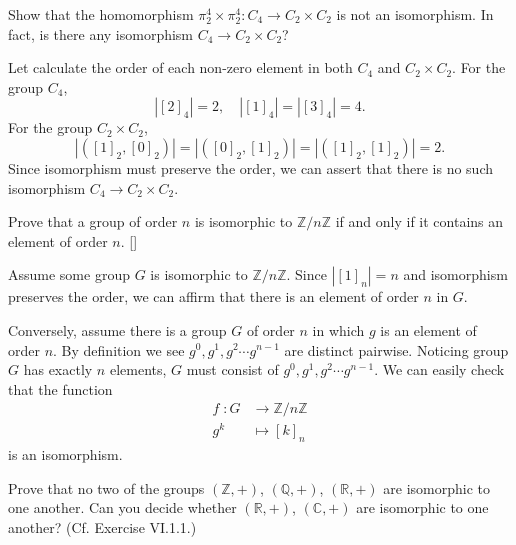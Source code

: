 \documentclass[12pt,letterpaper,boxed]{hmcpset}
\begin{document}
\begin{problem}[4.2]
 Show that the homomorphism $\pi_2^4\times\pi_2^4:C_4\rightarrow C_2\times C_2$ is not an isomorphism. In fact, is there any isomorphism $C_4\rightarrow C_2\times C_2$?
\end{problem}

\begin{solution}
	Let calculate the order of each non-zero element in both $C_4$ and $ C_2\times C_2$. For the group $C_4$,
	\[
	|[2]_4|=2,\quad\left|[1]_4\right|=\left|[3]_4\right|=4.
	\]
	For the group $C_2\times C_2$,
	\[
	|([1]_2,[0]_2)|=|([0]_2,[1]_2)|=|([1]_2,[1]_2)|=2.
	\]
	Since isomorphism must preserve the order, we can assert that there is no such isomorphism $C_4\rightarrow C_2\times C_2$.
\end{solution}


\begin{problem}[4.3]
	Prove that a group of order $n$ is isomorphic to $\mathbb{Z}/n\mathbb{Z}$ if and only if it contains
	an element of order $n$. []
\end{problem}

\begin{solution}
	Assume some group $G$ is isomorphic to $\mathbb{Z}/n\mathbb{Z}$. Since $|[1]_n|=n$ and isomorphism preserves the order, we can affirm that there is an element of order $n$ in $G$. 
	
	\noindent Conversely, assume there is a group $G$ of order $n$ in which $g$ is an element of order $n$. By definition we see $g^0,g^1,g^2\cdots g^{n-1}$ are distinct pairwise. Noticing group $G$ has exactly $n$ elements, $G$ must consist of $g^0,g^1,g^2\cdots g^{n-1}$. We can easily check that the function
	\[
	\begin{aligned}
	f\;: G&\longrightarrow \mathbb{Z}/n\mathbb{Z}\\  
	g^k&\longmapsto [k]_n
	\end{aligned}
	\]	
	is an isomorphism.	
\end{solution}


\begin{problem}[4.4]
	Prove that no two of the groups $(\mathbb{Z}, +)$, $(\mathbb{Q}, +)$, $(\mathbb{R},+)$ are isomorphic to one another. Can you decide whether $(\mathbb{R}, +)$, $(\mathbb{C}, +)$ are isomorphic to one another? (Cf. Exercise VI.1.1.)
\end{problem}
\end{document}
